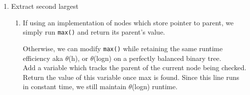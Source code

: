 \documentclass{article}
\begin{document}
\begin{enumerate}
\begin{enumerate}
        Derived from pseudo-code in Lecture 1 slides:
        \begin{lstlisting}[
        linebackgroundcolor={%
        \ifnum\value{lstnumber}=3
                \color{green!35}
        \fi
        \ifnum\value{lstnumber}=9
                \color{green!35}
        \fi
        \ifnum\value{lstnumber}=32
                \color{green!35}
        \fi
                },
]

mergeSortInversions(A,p,r) {
    inv = 0; // variable to track inversions, 
    		// gets passed to merge()
    if (p < r) {
        q = floor((p+r)/2)
        mergeSortInversions(A,p,q)
        mergeSortInversions(A, q+1, r)
        merge(A,p,q,r,inv)
    }
    return inv;
}
            
merge(A, p, q, r, inv) {
    n1 = q - p + 1
    n2 = r - q
    copy A[p,q] to L[1...n1]
    copy A[q+1,r] to R[1...n2]
    L[n1+1] = R[n1+1] = +Inf
    i = j = 1
    for (k=p to r) {
        if (L[i] < R[j]) {
            A[k] = L[i]
            i++
        }
        else {
            // a value R[j] was taken from the right 
            // side in the process of merging;
            // R[j] must be an inversion relative to 
            // everything remaining on the left side
            A[k] = R[j]
            inv += L.length - i
            j++
        }
    }
}
        \end{lstlisting}
    \end{enumerate}
    
    \item Extract second largest
    
    \begin{enumerate}
    	\item If using an implementation of nodes which store pointer to parent, we simply run \texttt{max()} and return its parent's value. \newline
    	
    	Otherwise, we can modify \texttt{max()} while retaining the same runtime efficiency aka $\theta$(h), or $\theta$(logn) on a perfectly balanced binary tree. \newline \\
    	Add a variable which tracks the parent of the current node being checked. Return the value of this variable once max is found. Since this line runs in constant time, we still maintain  $\theta$(logn) runtime. \newline
    	\begin{lstlisting}
    		
    	\end{lstlisting}
    	
	\end{enumerate}	
\end{enumerate}
\end{document}
